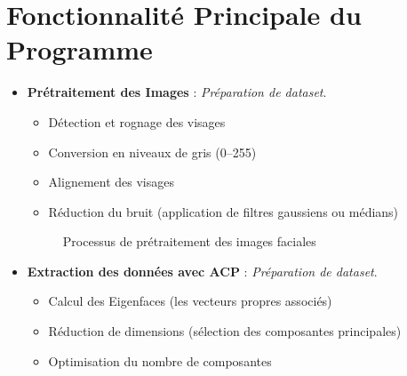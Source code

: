 \documentclass[a4paper,12pt]{report} %
\begin{document}
\chapter{Fonctionnalité Principale du Programme}
\begin{itemize}
    \item \textbf{Prétraitement des Images} : \textit{Préparation de dataset}.
    \begin{itemize}
        \item Détection et rognage des visages
        \item Conversion en niveaux de gris (0–255)
        \item Alignement des visages
        \item Réduction du bruit (application de filtres gaussiens ou médians)
    \end{itemize}

    \vspace{0.2cm}
    \begin{figure}[ht]
        \centering
        \caption{Processus de prétraitement des images faciales}
        \label{fig:preprocessing_flow}
    \end{figure}
\end{itemize}

\begin{itemize}
    \item \textbf{Extraction des données avec ACP} : \textit{Préparation de dataset}.
    \begin{itemize}
        \item Calcul des Eigenfaces (les vecteurs propres associés)
        \item Réduction de dimensions (sélection des composantes principales)
        \item Optimisation du nombre de composantes
    \end{itemize}
\end{itemize}
\end{document}
